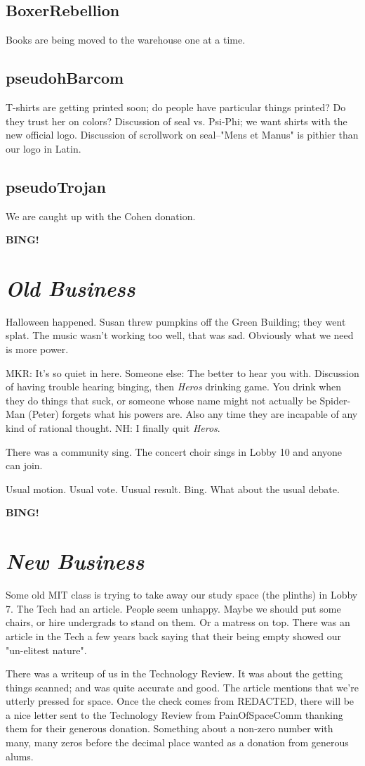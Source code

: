 \documentclass[10pt]{article}
\newcommand{\bing}{{\bf BING!} }
\newcommand{\goto}[1]{\bing \vskip 12pt \section*{{\em{#1}}}}
\begin{document}
\subsection{BoxerRebellion}
Books are being moved to the warehouse one at a time.

\subsection{pseudohBarcom}
T-shirts are getting printed soon; do people have particular things printed?  Do they trust her on colors?  Discussion of seal vs. Psi-Phi; we want shirts with the new official logo.  Discussion of scrollwork on seal--"Mens et Manus" is pithier than our logo in Latin.

\subsection{pseudoTrojan}
We are caught up with the Cohen donation.

\goto{Old Business}

Halloween happened.  Susan threw pumpkins off the Green Building; they went splat.  The music wasn't working too well, that was sad.  Obviously what we need is more power.

MKR: It's so quiet in here.  Someone else: The better to hear you with.  Discussion of having trouble hearing binging, then \emph{Heros} drinking game.  You drink when they do things that suck, or someone whose name might not actually be Spider-Man (Peter) forgets what his powers are.  Also any time they are incapable of any kind of rational thought.  NH: I finally quit \emph{Heros}.

There was a community sing.  The concert choir sings in Lobby 10 and anyone can join.

Usual motion.  Usual vote.  Uusual result.  Bing.  What about the usual debate.

\goto{New Business}

Some old MIT class is trying to take away our study space (the plinths) in Lobby 7.  The Tech had an article.  People seem unhappy.  Maybe we should put some chairs, or hire undergrads to stand on them.  Or a matress on top.  There was an article in the Tech a few years back saying that their being empty showed our "un-elitest nature".

There was a writeup of us in the Technology Review.  It was about the getting things scanned; and was quite accurate and good.  The article mentions that we're utterly pressed for space.  Once the check comes from REDACTED, there will be a nice letter sent to the Technology Review from PainOfSpaceComm thanking them for their generous donation.  Something about a non-zero number with many, many zeros before the decimal place wanted as a donation from generous alums.
\end{document}
